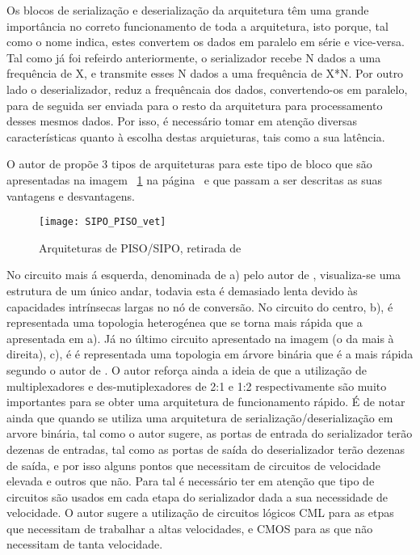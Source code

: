Os blocos de serialização e deserialização da arquitetura têm uma grande importância no correto funcionamento de toda a arquitetura, isto porque, tal como o nome indica, estes convertem os dados em paralelo em série e vice-versa. Tal como já foi refeirdo anteriormente, o serializador recebe N dados a uma frequência de X, e transmite esses N dados a uma frequência de X*N. Por outro lado o deserializador, reduz a frequêncaia dos dados, convertendo-os em paralelo, para de seguida ser enviada para o resto da arquitetura para processamento desses mesmos dados. Por isso, é necessário tomar em atenção diversas características quanto à escolha destas arquieturas, tais como a sua latência.

O autor de \cite{R012} propõe 3 tipos de arquiteturas para este tipo de bloco que são apresentadas na imagem ~\ref{fig:PISO-SIPO} na página~\pageref{fig:PISO-SIPO} e que passam a ser descritas as suas vantagens e desvantagens.


	\begin{figure}[h!]
	\begin{center}
		\leavevmode
		\texttt{[image: SIPO\_PISO\_vet]}
		\caption{Arquiteturas de PISO/SIPO, retirada de \cite{R012}}
		\label{fig:PISO-SIPO}
	\end{center}
\end{figure}

No circuito mais á esquerda, denominada de a) pelo autor de \cite{R012}, visualiza-se uma estrutura de um único andar, todavia esta é demasiado lenta devido às capacidades intrínsecas largas no nó de conversão. No circuito do centro, b), é representada uma topologia  heterogénea que se torna mais rápida que a apresentada em a). Já no último circuito apresentado na imagem (o da mais à direita), c), é é representada uma topologia em árvore binária que é a mais rápida segundo o autor de \cite{R012}. O autor reforça ainda a ideia de que a utilização de multiplexadores e des-mutiplexadores de 2:1 e 1:2 respectivamente são muito importantes para se obter uma arquitetura de funcionamento rápido. É de notar ainda que quando se utiliza uma arquitetura de serialização/deserialização em arvore binária, tal como o autor sugere, as portas de entrada do serializador terão dezenas de entradas, tal como as portas de saída do deserializador terão dezenas de saída, e por isso alguns pontos que necessitam de circuitos de velocidade elevada e outros que não. Para tal é necessário ter em atenção que tipo de circuitos são usados em cada etapa do serializador dada a sua necessidade de velocidade. O autor sugere a utilização de circuitos lógicos CML para as etpas que necessitam de trabalhar a altas velocidades, e CMOS para as que não necessitam de tanta velocidade.

